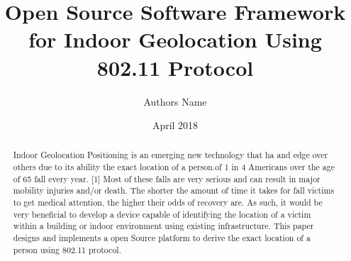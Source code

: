 \documentclass[conference]{IEEEtran}
\title{Open Source Software Framework for Indoor Geolocation Using 802.11 Protocol}
\author{Authors Name }
\date{April 2018}
\begin{document}
\maketitle
\begin{abstract}
Indoor Geolocation Positioning is an emerging new technology that ha and edge over others due to its ability the exact location of a person.of 1 in 4 Americans over the age of 65 fall every year. [1] Most of these falls
are very serious and can result in major mobility injuries and/or death. The
shorter the amount of time it takes for fall victims to get medical attention, the
higher their odds of recovery are. As such, it would be very beneficial to develop a
device capable of identifying the location of a victim within a building or indoor
environment using existing infrastructure. 
\newline This paper designs and implements a open Source platform to derive the exact location of a person using 802.11 protocol.
\end{abstract}
\end{document}

